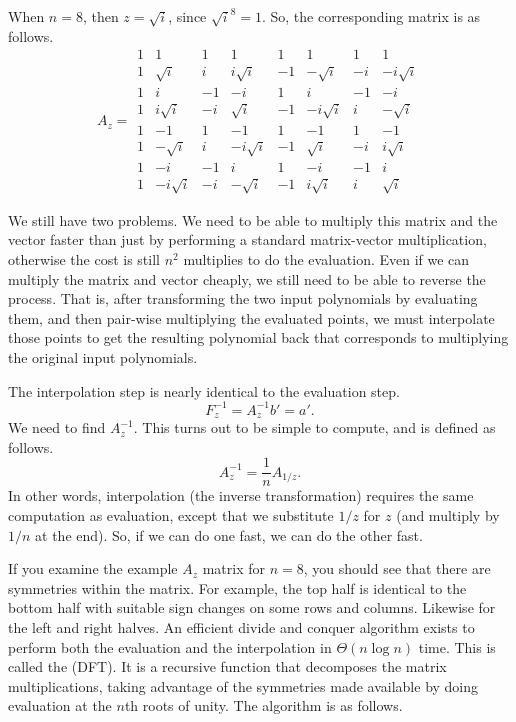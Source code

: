 When $n = 8$, then $z = \sqrt{i}$, since $\sqrt{i}^8 = 1$.
So, the corresponding matrix is as follows.
\[A_{z} =
\begin{array}{rrrrrrrr}
1&         1& 1&         1& 1&         1& 1&         1\\
1&  \sqrt{i}& i& i\sqrt{i}&-1& -\sqrt{i}&-i&-i\sqrt{i}\\
1&         i&-1&        -i& 1&         i&-1&        -i\\
1& i\sqrt{i}&-i&  \sqrt{i}&-1&-i\sqrt{i}& i& -\sqrt{i}\\
1&        -1& 1&        -1& 1&        -1& 1&        -1\\
1& -\sqrt{i}& i&-i\sqrt{i}&-1&  \sqrt{i}&-i& i\sqrt{i}\\
1&        -i&-1&         i& 1&        -i&-1&         i\\
1&-i\sqrt{i}&-i& -\sqrt{i}&-1& i\sqrt{i}& i&  \sqrt{i}
\end{array}
\]

We still have two problems.
We need to be able to multiply this matrix and the vector faster
than just by performing a standard matrix-vector multiplication,
otherwise the cost is still $n^2$ multiplies to do the evaluation.
Even if we can multiply the matrix and vector cheaply, we still
need to be able to reverse the process.
That is, after transforming the two input polynomials by evaluating
them, and then pair-wise multiplying the evaluated points, we must
interpolate those points to get the resulting polynomial back that
corresponds to multiplying the original input polynomials.

The interpolation step is nearly identical to the evaluation step.
\[F_{z}^{-1} = A_{z}^{-1}b' = a'.\]
We need to find $A_{z}^{-1}$.
This turns out to be simple to compute, and is defined as follows.
\[A_{z}^{-1} = \frac{1}{n}A_{1/z}.\]
In other words, interpolation (the inverse transformation) requires
the same computation as evaluation, except that we substitute $1/z$ 
for $z$ (and multiply by $1/n$ at the end).
So, if we can do one fast, we can do the other fast.

If you examine the example $A_z$ matrix for $n=8$,
you should see that there
are symmetries within the matrix.
For example, the top half is identical to the bottom half with
suitable sign changes on some rows and columns.
Likewise for the left and right halves.
An efficient divide and conquer algorithm exists to perform both the
evaluation and the interpolation in $\Theta(n \log n)$ time.
This is called the  (DFT).
It is a recursive function that decomposes the matrix
multiplications, taking advantage of the symmetries made available by
doing evaluation at the $n$th roots of unity.
The algorithm is as follows.

